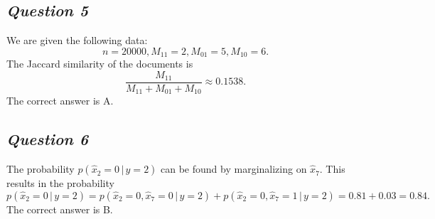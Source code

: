 \documentclass[twoside,11pt]{article}
\makeatletter
\let\@oldsubsection\subsection
\renewcommand\subsection[1]{\@oldsubsection*{\textit{#1}}}
\makeatother
\begin{document}
\subsection{Question 5}

We are given the following data:
\[
	n = 20000, M_{11} = 2, M_{01} = 5, M_{10} = 6.
\]
The Jaccard similarity of the documents is
\[
	\frac{M_{11}}{M_{11} + M_{01} + M_{10}} \approx 0.1538.
\]
The correct answer is A.

\subsection{Question 6}

The probability \(p(\hat{x}_2 = 0 \, | \, y = 2)\) can be found by marginalizing on \(\hat{x}_7\). This results in the probability
\[
	p(\hat{x}_2 = 0 \, | \, y = 2) = p(\hat{x}_2 = 0, \hat{x}_7 = 0 \, | \, y = 2)
	+ p(\hat{x}_2 = 0, \hat{x}_7 = 1 \, | \, y = 2) = 0.81 + 0.03 = 0.84.
\]
The correct answer is B.


\end{document}
